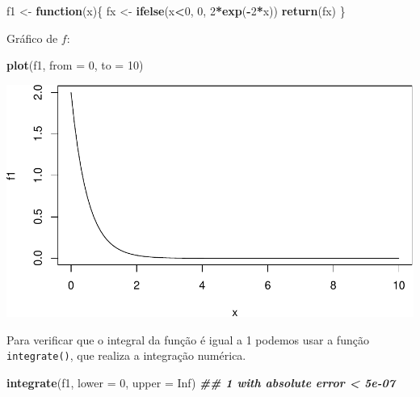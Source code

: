 \documentclass[
]{book}
\newenvironment{Shaded}{\begin{snugshade}}{\end{snugshade}}
\newcommand{\AttributeTok}[1]{\textcolor[rgb]{0.13,0.29,0.53}{#1}}
\newcommand{\ConstantTok}[1]{\textcolor[rgb]{0.56,0.35,0.01}{#1}}
\newcommand{\ControlFlowTok}[1]{\textcolor[rgb]{0.13,0.29,0.53}{\textbf{#1}}}
\newcommand{\DecValTok}[1]{\textcolor[rgb]{0.00,0.00,0.81}{#1}}
\newcommand{\DocumentationTok}[1]{\textcolor[rgb]{0.56,0.35,0.01}{\textbf{\textit{#1}}}}
\newcommand{\FunctionTok}[1]{\textcolor[rgb]{0.13,0.29,0.53}{\textbf{#1}}}
\newcommand{\NormalTok}[1]{#1}
\newcommand{\OtherTok}[1]{\textcolor[rgb]{0.56,0.35,0.01}{#1}}
\newcommand{\SpecialCharTok}[1]{\textcolor[rgb]{0.81,0.36,0.00}{\textbf{#1}}}
\begin{document}
\begin{Shaded}
\begin{Highlighting}[]
\NormalTok{f1 }\OtherTok{\textless{}{-}} \ControlFlowTok{function}\NormalTok{(x)\{}
\NormalTok{  fx }\OtherTok{\textless{}{-}} \FunctionTok{ifelse}\NormalTok{(x}\SpecialCharTok{\textless{}}\DecValTok{0}\NormalTok{, }\DecValTok{0}\NormalTok{, }\DecValTok{2}\SpecialCharTok{*}\FunctionTok{exp}\NormalTok{(}\SpecialCharTok{{-}}\DecValTok{2}\SpecialCharTok{*}\NormalTok{x))}
  \FunctionTok{return}\NormalTok{(fx)}
\NormalTok{\}}
\end{Highlighting}
\end{Shaded}

Gráfico de \(f\):

\begin{Shaded}
\begin{Highlighting}[]
\FunctionTok{plot}\NormalTok{(f1, }\AttributeTok{from =} \DecValTok{0}\NormalTok{, }\AttributeTok{to =} \DecValTok{10}\NormalTok{)}
\end{Highlighting}
\end{Shaded}

\includegraphics{introR_files/figure-latex/unnamed-chunk-231-1.pdf}

Para verificar que o integral da função é igual a 1 podemos usar a função \texttt{integrate()}, que realiza a integração numérica.

\begin{Shaded}
\begin{Highlighting}[]
\FunctionTok{integrate}\NormalTok{(f1, }\AttributeTok{lower =} \DecValTok{0}\NormalTok{, }\AttributeTok{upper =} \ConstantTok{Inf}\NormalTok{)}
\DocumentationTok{\#\# 1 with absolute error \textless{} 5e{-}07}
\end{Highlighting}
\end{Shaded}
\end{document}

